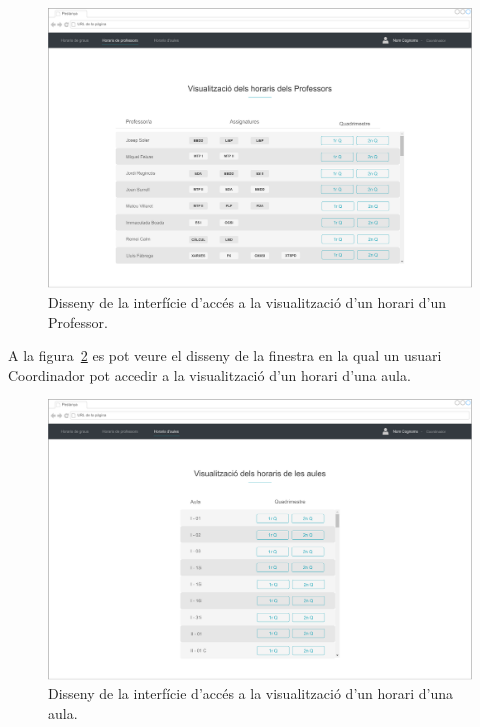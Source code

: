 \documentclass[a4paper,12pt]{ThesisStyle}
\begin{document}
\begin{figure}[H]
	\centering
	\includegraphics[width=\textwidth]{assets/interfaces/horaris/seleccioProfessor.pdf}
	\caption{\label{img:horaris_seleccioProfessor}Disseny de la interfície d'accés a la visualització d'un horari d'un Professor.}
\end{figure}

A la figura~\ref{img:horaris_seleccioAula} es pot veure el disseny de la finestra en la qual un usuari Coordinador pot accedir a la visualització d'un horari d'una aula.

\begin{figure}[H]
	\centering
	\includegraphics[width=\textwidth]{assets/interfaces/horaris/seleccioAula.pdf}
	\caption{\label{img:horaris_seleccioAula}Disseny de la interfície d'accés a la visualització d'un horari d'una aula.}
\end{figure}
\end{document}
